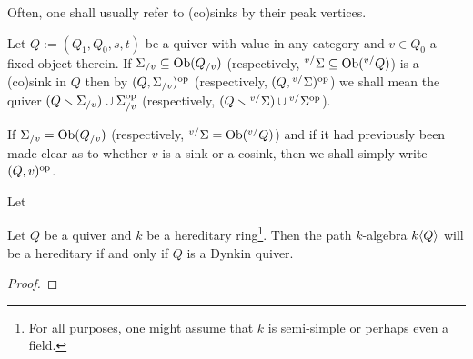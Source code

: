             \begin{convention}
                Often, one shall usually refer to (co)sinks by their peak vertices.
            \end{convention}
            \begin{convention}
                Let $Q := (Q_1, Q_0, s, t)$ be a quiver with value in any category and $v \in Q_0$ a fixed object therein. If $\Sigma_{/v} \subseteq \mathrm{Ob}(Q_{/v})$ (respectively, ${}^{v/}\Sigma \subseteq \mathrm{Ob}({}^{v/}Q)$) is a (co)sink in $Q$ then by $(Q, \Sigma_{/v})^{\mathrm{op}}$ (respectively, $(Q, {}^{v/}\Sigma)^{\mathrm{op}}$) we shall mean the quiver $(Q \smallsetminus \Sigma_{/v}) \cup \Sigma_{/v}^{\mathrm{op}}$ (respectively, $(Q \smallsetminus {}^{v/}\Sigma) \cup {}^{v/}\Sigma^{\mathrm{op}}$).
                
                If $\Sigma_{/v} = \mathrm{Ob}(Q_{/v})$ (respectively, ${}^{v/}\Sigma = \mathrm{Ob}({}^{v/}Q)$) and if it had previously been made clear as to whether $v$ is a sink or a cosink, then we shall simply write $(Q, v)^{\mathrm{op}}$.
            \end{convention}
            \begin{definition} \label{def: reflection_functors}
                Let 
            \end{definition}
            
            \begin{lemma} \label{lemma: path_algebras_of_dynkin_quivers_are_hereditary}
                Let $Q$ be a quiver and $k$ be a hereditary ring\footnote{For all purposes, one might assume that $k$ is semi-simple or perhaps even a field.}. Then the path $k$-algebra $k\langle Q\rangle$ will be a hereditary if and only if $Q$ is a Dynkin quiver.
            \end{lemma}
                \begin{proof}
                    
                \end{proof}